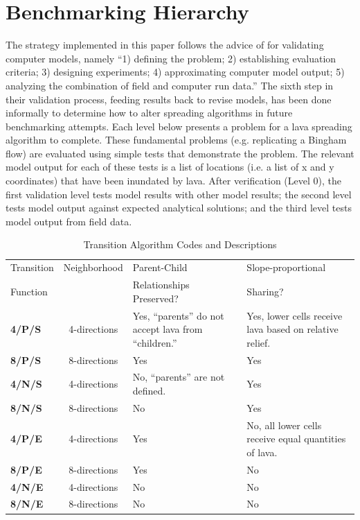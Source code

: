 \documentclass[12pt,letter]{article}
\begin{document}
			
			
			

	\section{Benchmarking Hierarchy}\label{sec:benchmark}
	
	The strategy implemented in this paper follows the advice of \citet{bayarri2007framework} for validating computer models, namely ``1) defining the problem; 2) establishing evaluation criteria; 3) designing experiments; 4) approximating computer model output; 5) analyzing the combination of field and computer run data.'' The sixth step in their validation process, feeding results back to revise models, has been done informally to determine how to alter spreading algorithms in future benchmarking attempts. Each level below presents a problem for a lava spreading algorithm to complete. These fundamental problems (e.g. replicating a Bingham flow) are evaluated using simple tests that demonstrate the problem. The relevant model output for each of these tests is a list of locations (i.e. a list of x and y coordinates) that have been inundated by lava. After verification (Level 0), the first validation level tests model results with other model results; the second level tests model output against expected analytical solutions; and the third level tests model output from field data.

	\begin{center}
		\begin{table}[h]
		\caption{Transition Algorithm Codes and Descriptions}
		\begin{tabular}{l c p{5cm} p{5cm}}
			\toprule
			Transition&Neighborhood&Parent-Child&Slope-proportional\\
			Function&&Relationships Preserved?&Sharing?\\
			\midrule
			\textbf{4/P/S} &4-directions & Yes, ``parents'' do not accept lava from ``children.'' & Yes, lower cells receive lava based on relative relief.\\
			\textbf{8/P/S} &8-directions & Yes & Yes\\
			\textbf{4/N/S} &4-directions & No, ``parents'' are not defined. & Yes\\
			\textbf{8/N/S} &8-directions & No  & Yes\\
			\textbf{4/P/E} &4-directions & Yes & No, all lower cells receive equal quantities of lava.\\
			\textbf{8/P/E} &8-directions & Yes & No\\
			\textbf{4/N/E} &4-directions & No  & No\\
			\textbf{8/N/E} &8-directions & No  & No\\
			
			\bottomrule
		\end{tabular}
		\label{tab_algorithmcodes}
		\end{table}
	\end{center}
\end{document}
